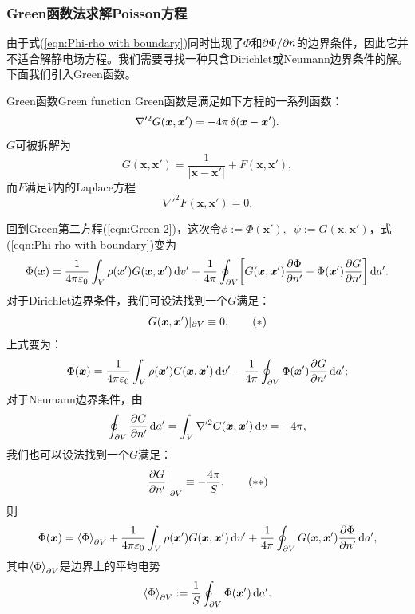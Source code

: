\subsubsection{Green函数法求解Poisson方程}
\label{sssec:Green solve Poisson}
由于式(\ref{eqn:Phi-rho with boundary})同时出现了$\Phi$和$\partial\Phi/\partial n$的边界条件，因此它并不适合解静电场方程。我们需要寻找一种只含Dirichlet或Neumann边界条件的解。下面我们引入Green函数。
\begin{definition}{Green函数}{Green function}
    Green函数是满足如下方程的一系列函数：
    \begin{align}
        \nabla'^2G(\bm x,\bm x')=-4\pi\mathop{}\!\delta(\bm x-\bm x').
    \end{align}
    $G$可被拆解为
    \[
        G(\bm x,\bm x')=\frac1{|\bm x-\bm x'|}+F(\bm x,\bm x'),
    \]
    而$F$满足$V$内的Laplace方程
    \[
        \nabla'^2F(\bm x,\bm x')=0.
    \]
\end{definition}
回到Green第二方程(\ref{eqn:Green 2})，这次令$\phi:=\Phi(\bm x'),\enspace\psi:=G(\bm x,\bm x')$，式(\ref{eqn:Phi-rho with boundary})变为
\begin{align*}
    \Phi(\bm x)=\frac1{4\pi\varepsilon_0}\int_V\rho(\bm x')G(\bm x,\bm x')\d v'+\frac1{4\pi}\oint_{\p V}\biggfkh{G(\bm x,\bm x')\pv\Phi{n'}-\Phi(\bm x')\pv G{n'}}\d a'.
\end{align*}
对于Dirichlet边界条件，我们可设法找到一个$G$满足：
\begin{equation}
    \label{eqn:Dirichlet Green condition}
    G(\bm x,\bm x')|_{\partial V}\equiv 0,\tag{$\ast$}
\end{equation}
上式变为：
\begin{align}
    \label{eqn:Dirichlet Green}
    \Phi(\bm x)=\frac1{4\pi\varepsilon_0}\int_V\rho(\bm x')G(\bm x,\bm x')\mathop{}\!\mathrm{d} v'-\frac1{4\pi}\oint_{\partial V}\Phi(\bm x')\frac{\partial^{\;\!\!}G}{\partial n'^{\;\!\!}}\mathop{}\!\mathrm{d} a';
\end{align}
对于Neumann边界条件，由
\[
    \oint_{\partial V}\frac{\partial^{\;\!\!}G}{\partial n'^{\;\!\!}}\mathop{}\!\mathrm{d} a'=\int_V\nabla'^2G(\bm x,\bm x')\mathop{}\!\mathrm{d} v=-4\pi,
\]
我们也可以设法找到一个$G$满足：
\begin{equation}
    \label{eqn:Neumann Green condition}
    \left.\frac{\partial^{\;\!\!}G}{\partial n'^{\;\!\!}}\right\rvert_{\partial V}\equiv-\frac{4\pi}S,\tag{$\ast\ast$}
\end{equation}
则
\begin{align}
    \label{eqn:Neumann Green}
    \Phi(\bm x)=\left\langle \Phi\right\rangle_{\partial V}+\frac1{4\pi\varepsilon_0}\int_V\rho(\bm x')G(\bm x,\bm x')\mathop{}\!\mathrm{d} v'+\frac1{4\pi}\oint_{\partial V}G(\bm x,\bm x')\frac{\partial^{\;\!\!}\Phi}{\partial n'^{\;\!\!}}\mathop{}\!\mathrm{d} a',
\end{align}
其中$\left\langle \Phi\right\rangle_{\partial V}$是边界上的平均电势
\[
    \left\langle \Phi\right\rangle_{\partial V}:=\frac1S\oint_{\partial V}\Phi(\bm x')\mathop{}\!\mathrm{d} a'.
\]
